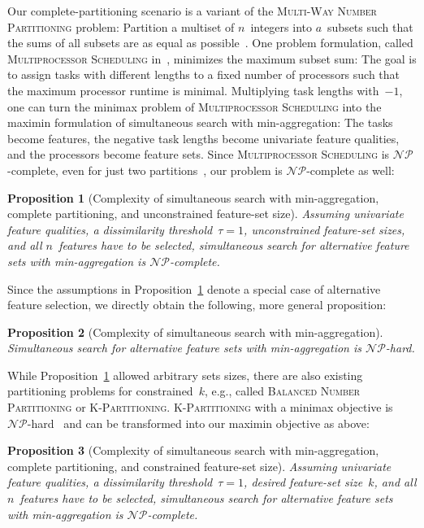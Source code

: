 \documentclass{article}
\newtheorem{proposition}{Proposition}
\theoremstyle{definition}
\begin{document}
Our complete-partitioning scenario is a variant of the \textsc{Multi-Way Number Partitioning} problem:
Partition a multiset of $n$~integers into $a$~subsets such that the sums of all subsets are as equal as possible~\cite{korf2010objective}.
One problem formulation, called \textsc{Multiprocessor Scheduling} in~\cite{garey2003computers}, minimizes the maximum subset sum:
The goal is to assign tasks with different lengths to a fixed number of processors such that the maximum processor runtime is minimal.
Multiplying task lengths with~$-1$, one can turn the minimax problem of \textsc{Multiprocessor Scheduling} into the maximin formulation of simultaneous search with min-aggregation:
The tasks become features, the negative task lengths become univariate feature qualities, and the processors become feature sets. 
Since \textsc{Multiprocessor Scheduling} is $\mathcal{NP}$-complete, even for just two partitions~\cite{garey2003computers}, our problem is $\mathcal{NP}$-complete as well:
%
\begin{proposition}[Complexity of simultaneous search with min-aggregation, complete partitioning, and unconstrained feature-set size]
	Assuming univariate feature qualities, a dissimilarity threshold~$\tau = 1$, unconstrained feature-set sizes, and all $n$~features have to be selected, simultaneous search for alternative feature sets with min-aggregation is $\mathcal{NP}$-complete.
	\label{prop:afs:complexity-partitioning-min-unconstrained-k}
\end{proposition}
%
Since the assumptions in Proposition~\ref{prop:afs:complexity-partitioning-min-unconstrained-k} denote a special case of alternative feature selection, we directly obtain the following, more general proposition:
%
\begin{proposition}[Complexity of simultaneous search with min-aggregation]
	Simultaneous search for alternative feature sets with min-aggregation is $\mathcal{NP}$-hard.
	\label{prop:afs:complexity-simultaneous-np}
\end{proposition}
%
While Proposition~\ref{prop:afs:complexity-partitioning-min-unconstrained-k} allowed arbitrary sets sizes, there are also existing partitioning problems for constrained~$k$, e.g., called \textsc{Balanced Number Partitioning} or \textsc{K-Partitioning}.
\textsc{K-Partitioning} with a minimax objective is $\mathcal{NP}$-hard~\cite{babel1998thek} and
can be transformed into our maximin objective as above:
%
\begin{proposition}[Complexity of simultaneous search with min-aggregation, complete partitioning, and constrained feature-set size]
	Assuming univariate feature qualities, a dissimilarity threshold~$\tau = 1$, desired feature-set size~$k$, and all $n$~features have to be selected, simultaneous search for alternative feature sets with min-aggregation is $\mathcal{NP}$-complete.
	\label{prop:afs:complexity-partitioning-min-constrained-k}
\end{proposition}
\end{document}
